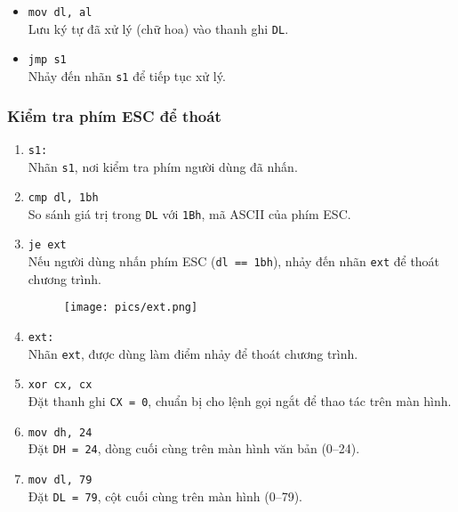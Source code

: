 \documentclass[12pt]{article}
\begin{document}
\begin{enumerate}[label=\textbf{\arabic*.}]
\begin{itemize}
        \item \texttt{mov dl, al} \\
        Lưu ký tự đã xử lý (chữ hoa) vào thanh ghi \texttt{DL}.
        
        \item \texttt{jmp s1} \\
        Nhảy đến nhãn \texttt{s1} để tiếp tục xử lý.
    \end{itemize}
\end{enumerate}



\subsubsection*{Kiểm tra phím ESC để thoát}
\begin{enumerate}[label=\textbf{\arabic*.}]
    \item \texttt{s1:} \\
    Nhãn \texttt{s1}, nơi kiểm tra phím người dùng đã nhấn.
    
    \item \texttt{cmp dl, 1bh} \\
    So sánh giá trị trong \texttt{DL} với \texttt{1Bh}, mã ASCII của phím ESC.
    
    \item \texttt{je ext} \\
    Nếu người dùng nhấn phím ESC (\texttt{dl == 1bh}), nhảy đến nhãn \texttt{ext} để thoát chương trình.
    \begin{figure}[H]
  \centering
  \texttt{[image: pics/ext.png]}
\end{figure}
    \item \texttt{ext:} \\
    Nhãn \texttt{ext}, được dùng làm điểm nhảy để thoát chương trình.
    
    \item \texttt{xor cx, cx} \\
    Đặt thanh ghi \texttt{CX = 0}, chuẩn bị cho lệnh gọi ngắt để thao tác trên màn hình.
    
    \item \texttt{mov dh, 24} \\
    Đặt \texttt{DH = 24}, dòng cuối cùng trên màn hình văn bản (0–24).
    
    \item \texttt{mov dl, 79} \\
    Đặt \texttt{DL = 79}, cột cuối cùng trên màn hình (0–79).
    

\end{enumerate}
\end{document}
